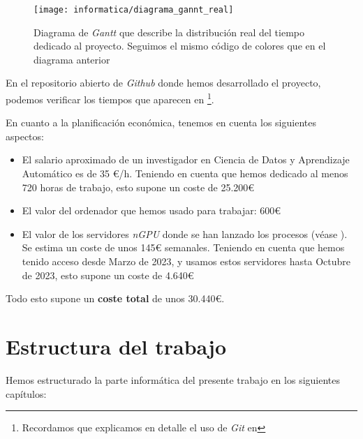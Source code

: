 \begin{figure}[H]
    \centering
    \texttt{[image: informatica/diagrama\_gannt\_real]}
    \caption{Diagrama de \textit{Gantt} que describe la distribución real del tiempo dedicado al proyecto. Seguimos el mismo código de colores que en el diagrama anterior}
    \label{img:gannt_real}
\end{figure}

En el repositorio abierto de \textit{Github} \cite{informatica:repogithub} donde hemos desarrollado el proyecto, podemos verificar los tiempos que aparecen en  \footnote{Recordamos que explicamos en detalle el uso de \textit{Git} en }.

En cuanto a la planificación económica, tenemos en cuenta los siguientes aspectos:

\begin{itemize}
    \item El salario aproximado de un investigador en Ciencia de Datos y Aprendizaje Automático es de 35 €/h. Teniendo en cuenta que hemos dedicado al menos 720 horas de trabajo, esto supone un coste de 25.200€
    \item El valor del ordenador que hemos usado para trabajar: 600€
    \item El valor de los servidores \textit{nGPU} donde se han lanzado los procesos (véase ). Se estima un coste de unos 145€ semanales. Teniendo en cuenta que hemos tenido acceso desde Marzo de 2023, y usamos estos servidores hasta Octubre de 2023, esto supone un coste de 4.640€
\end{itemize}

Todo esto supone un \textbf{coste total} de unos 30.440€.

\section{Estructura del trabajo}

Hemos estructurado la parte informática del presente trabajo en los siguientes capítulos:

